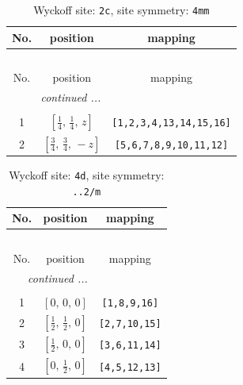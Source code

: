 \documentclass[fleqn,8pt]{jsarticle}
\begin{document}
\renewcommand{\arraystretch}{1.2}
\begin{longtable}{ccc}
\caption{Wyckoff site: {\tt 2c}, site symmetry: {\tt 4mm}}
 \\
 \hline \hline
No. & position & mapping \\ \hline \endfirsthead

\multicolumn{2}{l}{\tablename\ \thetable{}} \\
 \hline \hline
No. & position & mapping \\ \hline \endhead

 \hline \hline
\multicolumn{2}{r}{\footnotesize\it continued ...} \\ \endfoot

 \hline \hline
\multicolumn{2}{r}{} \\ \endlastfoot

1 & $\left[ \frac{1}{4},\, \frac{1}{4},\, z \right]$ & {\tt [1,2,3,4,13,14,15,16]} \\ \hline
2 & $\left[ \frac{3}{4},\, \frac{3}{4},\, - z \right]$ & {\tt [5,6,7,8,9,10,11,12]} \\
\end{longtable}
\renewcommand{\arraystretch}{1.2}
\begin{longtable}{ccc}
\caption{Wyckoff site: {\tt 4d}, site symmetry: {\tt ..2/m}}
 \\
 \hline \hline
No. & position & mapping \\ \hline \endfirsthead

\multicolumn{2}{l}{\tablename\ \thetable{}} \\
 \hline \hline
No. & position & mapping \\ \hline \endhead

 \hline \hline
\multicolumn{2}{r}{\footnotesize\it continued ...} \\ \endfoot

 \hline \hline
\multicolumn{2}{r}{} \\ \endlastfoot

1 & $\left[ 0,\, 0,\, 0 \right]$ & {\tt [1,8,9,16]} \\ \hline
2 & $\left[ \frac{1}{2},\, \frac{1}{2},\, 0 \right]$ & {\tt [2,7,10,15]} \\ \hline
3 & $\left[ \frac{1}{2},\, 0,\, 0 \right]$ & {\tt [3,6,11,14]} \\ \hline
4 & $\left[ 0,\, \frac{1}{2},\, 0 \right]$ & {\tt [4,5,12,13]} \\
\end{longtable}
\renewcommand{\arraystretch}{1.2}
\end{document}
